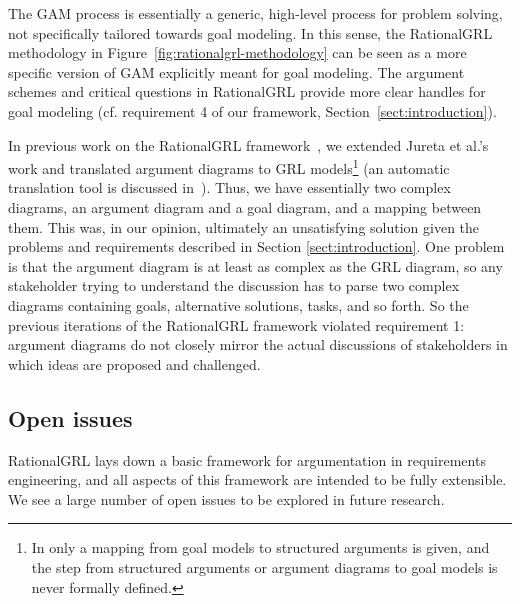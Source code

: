 The GAM process is essentially a generic, high-level process for problem solving, not specifically tailored towards goal modeling. In this sense, the RationalGRL methodology in Figure~\ref{fig:rationalgrl-methodology} can be seen as a more specific version of GAM explicitly meant for goal modeling. The argument schemes and critical questions in RationalGRL provide more clear handles for goal modeling (cf. requirement 4 of our framework, Section~\ref{sect:introduction}).  

In previous work on the RationalGRL framework~\cite{vanzee-etal:renext2015,vanZee-etal:er2016}, we extended Jureta et al.'s work and translated argument diagrams to GRL models\footnote{In \cite{Jureta:RE2008} only a mapping from goal models to structured arguments is given, and the step from structured arguments or argument diagrams to goal models is never formally defined.} (an automatic translation tool is discussed in~\cite{vanZee-etal:er2016}). Thus, we have essentially two complex diagrams, an argument diagram and a goal diagram, and a mapping between them. This was, in our opinion, ultimately an unsatisfying solution given the problems and requirements described in Section \ref{sect:introduction}. One problem is that the argument diagram is at least as complex as the GRL diagram, so any stakeholder trying to understand the discussion has to parse two complex diagrams containing goals, alternative solutions, tasks, and so forth. So the previous iterations of the RationalGRL framework violated requirement 1: argument diagrams do not closely mirror the actual discussions of stakeholders in which ideas are proposed and challenged. 

\subsection{Open issues}
\label{sect:goalmodeling:openissues}

RationalGRL lays down a basic framework for argumentation in requirements engineering, and all aspects of this framework are intended to be fully extensible. We see a large number of open issues to be explored in future research.

